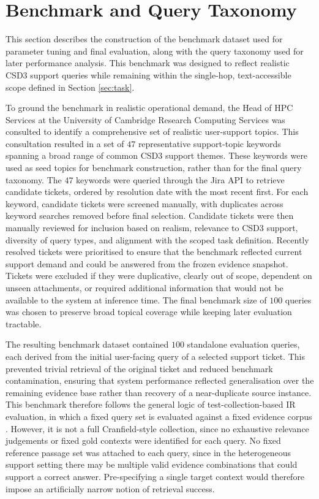 \section{Benchmark and Query Taxonomy}
\label{sec:benchmark}

This section describes the construction of the benchmark dataset used for parameter tuning and final evaluation, along with the query taxonomy used for later performance analysis. This benchmark was designed to reflect realistic \ac{CSD3} support queries while remaining within the single-hop, text-accessible scope defined in Section \ref{sec:task}. 

To ground the benchmark in realistic operational demand, the Head of \ac{HPC} Services at the University of Cambridge Research Computing Services was consulted to identify a comprehensive set of realistic user-support topics. This consultation resulted in a set of $47$ representative support-topic keywords spanning a broad range of common \ac{CSD3} support themes. These keywords were used as seed topics for benchmark construction, rather than for the final query taxonomy. The $47$ keywords were queried through the Jira API to retrieve candidate tickets, ordered by resolution date with the most recent first. For each keyword, candidate tickets were screened manually, with duplicates across keyword searches removed before final selection. Candidate tickets were then manually reviewed for inclusion based on realism, relevance to \ac{CSD3} support, diversity of query types, and alignment with the scoped task definition. Recently resolved tickets were prioritised to ensure that the benchmark reflected current support demand and could be answered from the frozen evidence snapshot. Tickets were excluded if they were duplicative, clearly out of scope, dependent on unseen attachments, or required additional information that would not be available to the system at inference time. The final benchmark size of $100$ queries was chosen to preserve broad topical coverage while keeping later evaluation tractable.  

The resulting benchmark dataset contained $100$ standalone evaluation queries, each derived from the initial user-facing query of a selected support ticket. This prevented trivial retrieval of the original ticket and reduced benchmark contamination, ensuring that system performance reflected generalisation over the remaining evidence base rather than recovery of a near-duplicate source instance. This benchmark therefore follows the general logic of test-collection-based \ac{IR} evaluation, in which a fixed query set is evaluated against a fixed evidence corpus \citep{sandersonTestCollectionBased2010}. However, it is not a full Cranfield-style collection, since no exhaustive relevance judgements or fixed gold contexts were identified for each query. No fixed reference passage set was attached to each query, since in the heterogeneous support setting there may be multiple valid evidence combinations that could support a correct answer. Pre-specifying a single target context would therefore impose an artificially narrow notion of retrieval success. 

